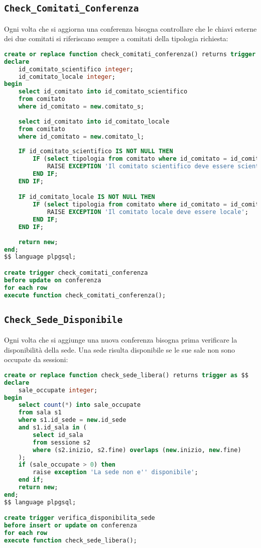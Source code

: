 \subsection{\texttt{Check\_Comitati\_Conferenza}}\label{trigger:check_comitati}
Ogni volta che si aggiorna una conferenza bisogna controllare che le chiavi esterne dei due comitati si riferiscano sempre a comitati della tipologia richiesta:
\begin{lstlisting}[language=SQL, caption={\texttt{check\_comitati\_conferenza}},style=mystyle]
create or replace function check_comitati_conferenza() returns trigger as $$
declare 
    id_comitato_scientifico integer;
    id_comitato_locale integer;
begin
    select id_comitato into id_comitato_scientifico
    from comitato
    where id_comitato = new.comitato_s;
    
    select id_comitato into id_comitato_locale
    from comitato
    where id_comitato = new.comitato_l;
    
    IF id_comitato_scientifico IS NOT NULL THEN
        IF (select tipologia from comitato where id_comitato = id_comitato_scientifico) <> 'scientifico' THEN
            RAISE EXCEPTION 'Il comitato scientifico deve essere scientifico';
        END IF;
    END IF;

    IF id_comitato_locale IS NOT NULL THEN
        IF (select tipologia from comitato where id_comitato = id_comitato_locale) <> 'locale' THEN
            RAISE EXCEPTION 'Il comitato locale deve essere locale';
        END IF;
    END IF;
    
    return new;
end;
$$ language plpgsql;

create trigger check_comitati_conferenza
before update on conferenza
for each row
execute function check_comitati_conferenza();
\end{lstlisting}
\subsection{\texttt{Check\_Sede\_Disponibile}}\label{trigger:check_sede_disponibile}
Ogni volta che si aggiunge una nuova conferenza bisogna prima verificare la disponibilità della sede. Una sede risulta disponibile se le sue sale non sono occupate da sessioni:
\begin{lstlisting}[caption={\texttt{Check\_sede\_libera}}, language=SQL, style=mystyle]
create or replace function check_sede_libera() returns trigger as $$
declare 
    sale_occupate integer;
begin
    select count(*) into sale_occupate
    from sala s1
    where s1.id_sede = new.id_sede
    and s1.id_sala in (
        select id_sala
        from sessione s2
        where (s2.inizio, s2.fine) overlaps (new.inizio, new.fine)
    );
    if (sale_occupate > 0) then
        raise exception 'La sede non e'' disponibile';
    end if;
    return new;
end;
$$ language plpgsql;

create trigger verifica_disponibilita_sede
before insert or update on conferenza
for each row
execute function check_sede_libera();
\end{lstlisting}
